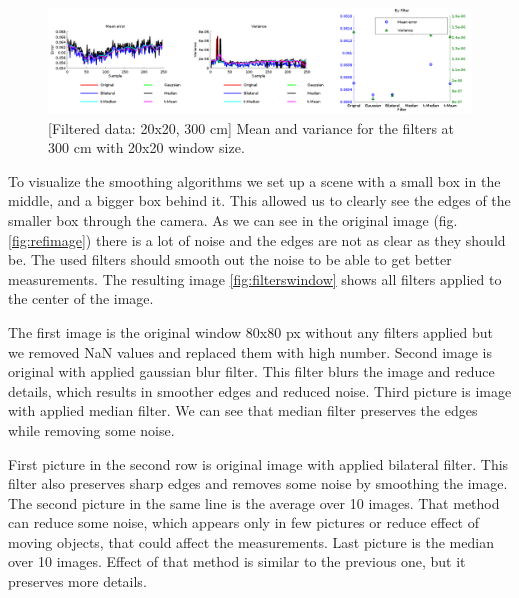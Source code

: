 \documentclass[11pt]{article}
\begin{document}
\begin{figure}[ht]
  \begin{center}
    \includegraphics[width=1\textwidth]{figures/filtered300cm.png}
    [Filtered data: 20x20, 300 cm]{\label{fig:300filt} Mean
      and variance for the filters at 300 cm with 20x20 window size.}
  \end{center}
\end{figure}

To visualize the smoothing algorithms we set up a scene with a small box in the
middle, and a bigger box behind it. This allowed us to clearly see the edges of
the smaller box through the camera. As we can see in the original image
(fig. \vref{fig:refimage}) there is a lot of noise and the edges are not as
clear as they should be. The used filters should smooth out the noise to be able
to get better measurements. The resulting image \vref{fig:filterswindow} shows
all filters applied to the center of the image. \par

The first image is the original window 80x80 px without any filters applied but
we removed NaN values and replaced them with high number. Second image is
original with applied gaussian blur filter. This filter blurs the image and
reduce details, which results in smoother edges and reduced noise. Third picture
is image with applied median filter. We can see that median filter preserves the
edges while removing some noise. \par

First picture in the second row is original image with applied bilateral
filter. This filter also preserves sharp edges and removes some noise by
smoothing the image. The second picture in the same line is the average over 10
images. That method can reduce some noise, which appears only in few pictures or
reduce effect of moving objects, that could affect the measurements. Last
picture is the median over 10 images. Effect of that method is similar to the
previous one, but it preserves more details.
\end{document}
